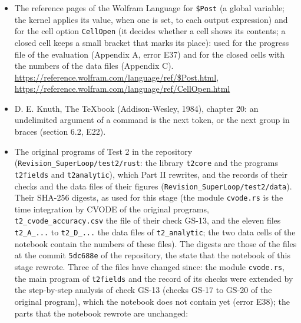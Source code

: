 \documentclass[
  10pt,
]{article}
\begin{document}
\begin{itemize}
  (section 11.5; the meaning of the two tolerances was also measured,
  check T2-IDA).
  \url{https://reference.wolfram.com/language/tutorial/NDSolveVectorNorm.html}
\item
  The reference pages of the Wolfram Language for \texttt{\$Post} (a
  global variable; the kernel applies its value, when one is set, to
  each output expression) and for the cell option \texttt{CellOpen} (it
  decides whether a cell shows its contents; a closed cell keeps a small
  bracket that marks its place): used for the progress file of the
  evaluation (Appendix A, error E37) and for the closed cells with the
  numbers of the data files (Appendix C).
  \url{https://reference.wolfram.com/language/ref/$Post.html},
  \url{https://reference.wolfram.com/language/ref/CellOpen.html}
\item
  D. E. Knuth, The TeXbook (Addison-Wesley, 1984), chapter 20: an
  undelimited argument of a command is the next token, or the next group
  in braces (section 6.2, E22).
\item
  The original programs of Test 2 in the repository
  (\texttt{Revision\_SuperLoop/test2/rust}: the library \texttt{t2core}
  and the programs \texttt{t2fields} and \texttt{t2analytic}), which
  Part II rewrites, and the records of their checks and the data files
  of their figures (\texttt{Revision\_SuperLoop/test2/data}). Their
  SHA-256 digests, as used for this stage (the module \texttt{cvode.rs}
  is the time integration by CVODE of the original programs,
  \texttt{t2\_cvode\_accuracy.csv} the file of their check GS-13, and
  the eleven files \texttt{t2\_A\_...} to \texttt{t2\_D\_...} the data
  files of \texttt{t2\_analytic}; the two data cells of the notebook
  contain the numbers of these files). The digests are those of the
  files at the commit \texttt{5dc688e} of the repository, the state that
  the notebook of this stage rewrote. Three of the files have changed
  since: the module \texttt{cvode.rs}, the main program of
  \texttt{t2fields} and the record of its checks were extended by the
  step-by-step analysis of check GS-13 (checks GS-17 to GS-20 of the
  original program), which the notebook does not contain yet (error
  E38); the parts that the notebook rewrote are unchanged:
\end{itemize}
\end{document}
